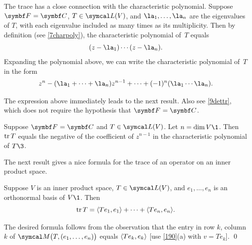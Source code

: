 The trace has a close connection with the characteristic polynomial. Suppose $\F{} = \C{}$, $T \in \L(V)$, and $\la_1, \dots, \la_n$ are the eigenvalues of $T$, with each eigenvalue included as many times as its multiplicity. Then by definition (see \ref{7charpoly}), the characteristic polynomial of~$T$ equals
\[
(z - \la_1) \dotsm (z - \la_n).
\]
Expanding the polynomial above, we can write the
characteristic polynomial of~$T$ in the form
\[
z^n - (\la_1 + \dots + \la_n) z^{n-1} + \dots + (-1)^n (\la_1 \dotsm \la_n).
\]

The expression above immediately leads to the next result. Also see \ref{9dettr}, which does not require the hypothesis that $\F{} = \C{}$.

{Suppose $\F{} = \C{}$ and $T \in \L(V)$. Let $n = \dim V\1$. Then $\operatorname{tr} T$ equals the negative of the coefficient of $z^{n-1}$ in the characteristic polynomial of $T\3$.}

The next result gives a nice formula for the trace of an operator on an inner product space.

{Suppose $V$ is an inner product space, $T \in \L(V)$, and $e_1, \ldots, e_n$ is an orthonormal basis of $V\1$. Then
\[
\operatorname{tr} T = \langle Te_1, e_1\rangle + \cdots + \langle Te_n, e_n\rangle.
\]}

\proof
The desired formula follows from the observation that the entry in row $k$, column $k$ of
$\M\paren[\big]{T, (e_1, \ldots, e_n)}$ equals $\langle Te_k, e_k\rangle$ [use \ref{190}(a) with $v = Te_k$].
\qed

